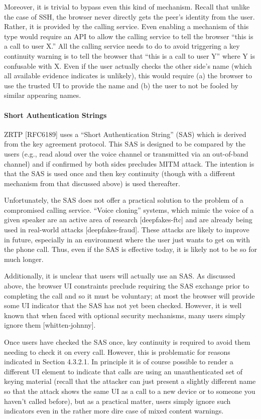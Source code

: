 \documentclass{article}
\begin{document}
Moreover, it is trivial to bypass even this kind of mechanism.
Recall that unlike the case of SSH, the browser never directly gets
the peer's identity from the user.  Rather, it is provided by the
calling service.  Even enabling a mechanism of this type would
require an API to allow the calling service to tell the browser ``this
is a call to user X.''  All the calling service needs to do to avoid
triggering a key continuity warning is to tell the browser that ``this
is a call to user Y'' where Y is confusable with X.  Even if the user
actually checks the other side's name (which all available evidence
indicates is unlikely), this would require (a) the browser to use the
trusted UI to provide the name and (b) the user to not be fooled by
similar appearing names.

\paragraph{Short Authentication Strings}

ZRTP [RFC6189] uses a ``Short Authentication String'' (SAS) which is
derived from the key agreement protocol.  This SAS is designed to be
compared by the users (e.g., read aloud over the voice channel or
transmitted via an out-of-band channel) and if confirmed by both
sides precludes MITM attack.  The intention is that the SAS is used
once and then key continuity (though with a different mechanism from
that discussed above) is used thereafter.

Unfortunately, the SAS does not offer a practical solution to the
problem of a compromised calling service.  ``Voice cloning'' systems,
which mimic the voice of a given speaker are an active area of
research [deepfakes-ftc] and are already being used in real-world
attacks [deepfakes-fraud].  These attacks are likely to improve in
future, especially in an environment where the user just wants to get
on with the phone call.  Thus, even if the SAS is effective today, it
is likely not to be so for much longer.

Additionally, it is unclear that users will actually use an SAS.  As
discussed above, the browser UI constraints preclude requiring the
SAS exchange prior to completing the call and so it must be
voluntary; at most the browser will provide some UI indicator that
the SAS has not yet been checked.  However, it is well known that
when faced with optional security mechanisms, many users simply
ignore them [whitten-johnny].

Once users have checked the SAS once, key continuity is required to
avoid them needing to check it on every call.  However, this is
problematic for reasons indicated in Section 4.3.2.1.  In principle
it is of course possible to render a different UI element to indicate
that calls are using an unauthenticated set of keying material
(recall that the attacker can just present a slightly different name
so that the attack shows the same UI as a call to a new device or to
someone you haven't called before), but as a practical matter, users
simply ignore such indicators even in the rather more dire case of
mixed content warnings.
\end{document}
